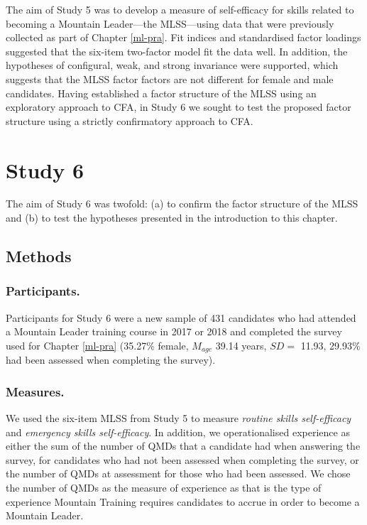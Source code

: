 \documentclass[
  12pt,
  a4paper,
]{book}
\begin{document}
The aim of Study 5 was to develop a measure of self-efficacy for skills related to becoming a Mountain Leader---the MLSS---using data that were previously collected as part of Chapter \ref{ml-pra}. Fit indices and standardised factor loadings suggested that the six-item two-factor model fit the data well. In addition, the hypotheses of configural, weak, and strong invariance were supported, which suggests that the MLSS factor factors are not different for female and male candidates. Having established a factor structure of the MLSS using an exploratory approach to CFA, in Study 6 we sought to test the proposed factor structure using a strictly confirmatory approach to CFA.

\hypertarget{study-6}{%
\section{Study 6}\label{study-6}}

The aim of Study 6 was twofold: (a) to confirm the factor structure of the MLSS and (b) to test the hypotheses presented in the introduction to this chapter.

\hypertarget{study-6-methods}{%
\subsection{Methods}\label{study-6-methods}}

\hypertarget{study-6-participants}{%
\subsubsection{Participants.}\label{study-6-participants}}

Participants for Study 6 were a new sample of 431 candidates who had attended a Mountain Leader training course in 2017 or 2018 and completed the survey used for Chapter \ref{ml-pra} (35.27\% female, \(M_{age}\) 39.14 years, \(SD =\) 11.93, 29.93\% had been assessed when completing the survey).

\hypertarget{study-6-measures}{%
\subsubsection{Measures.}\label{study-6-measures}}

We used the six-item MLSS from Study 5 to measure \emph{routine skills self-efficacy} and \emph{emergency skills self-efficacy}. In addition, we operationalised experience as either the sum of the number of QMDs that a candidate had when answering the survey, for candidates who had not been assessed when completing the survey, or the number of QMDs at assessment for those who had been assessed. We chose the number of QMDs as the measure of experience as that is the type of experience Mountain Training requires candidates to accrue in order to become a Mountain Leader.
\end{document}
